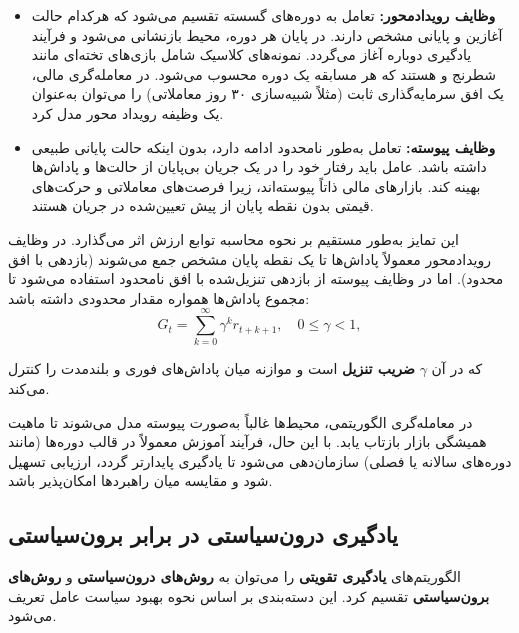 \documentclass[12pt, a4paper]{report}
\begin{document}
\begin{itemize}
    \item \textbf{وظایف رویدادمحور:} تعامل به دوره‌های گسسته تقسیم می‌شود که هرکدام حالت آغازین و پایانی مشخص دارند. در پایان هر دوره، محیط بازنشانی می‌شود و فرآیند یادگیری دوباره آغاز می‌گردد. نمونه‌های کلاسیک شامل بازی‌های تخته‌ای مانند شطرنج و  هستند که هر مسابقه یک دوره محسوب می‌شود. در معامله‌گری مالی، یک افق سرمایه‌گذاری ثابت (مثلاً شبیه‌سازی ۳۰ روز معاملاتی) را می‌توان به‌عنوان یک وظیفه رویداد محور مدل کرد.
    
    \item \textbf{وظایف پیوسته:} تعامل به‌طور نامحدود ادامه دارد، بدون اینکه حالت پایانی طبیعی داشته باشد. عامل باید رفتار خود را در یک جریان بی‌پایان از حالت‌ها و پاداش‌ها بهینه کند. بازارهای مالی ذاتاً پیوسته‌اند، زیرا فرصت‌های معاملاتی و حرکت‌های قیمتی بدون نقطه پایان از پیش تعیین‌شده در جریان هستند.
\end{itemize}

این تمایز به‌طور مستقیم بر نحوه محاسبه توابع ارزش اثر می‌گذارد. در وظایف رویدادمحور معمولاً پاداش‌ها تا یک نقطه پایان مشخص جمع می‌شوند (بازدهی با افق محدود). اما در وظایف پیوسته از بازدهی تنزیل‌شده با افق نامحدود استفاده می‌شود تا مجموع پاداش‌ها همواره مقدار محدودی داشته باشد:
\[
G_t = \sum_{k=0}^{\infty} \gamma^k r_{t+k+1}, \quad 0 \leq \gamma < 1,
\]

که در آن $\gamma$ \textbf{ضریب تنزیل}\protect{} است و موازنه میان پاداش‌های فوری و بلندمدت را کنترل می‌کند.

در معامله‌گری الگوریتمی، محیط‌ها غالباً به‌صورت پیوسته مدل می‌شوند تا ماهیت همیشگی بازار بازتاب یابد. با این حال، فرآیند آموزش معمولاً در قالب دوره‌ها (مانند دوره‌های سالانه یا فصلی) سازمان‌دهی می‌شود تا یادگیری پایدارتر گردد، ارزیابی تسهیل شود و مقایسه میان راهبردها امکان‌پذیر باشد.  

\subsection{یادگیری درون‌سیاستی\protect{} در برابر برون‌سیاستی\protect{}}

الگوریتم‌های \textbf{یادگیری تقویتی} را می‌توان به \textbf{روش‌های درون‌سیاستی} و \textbf{روش‌های برون‌سیاستی} تقسیم کرد. این دسته‌بندی بر اساس نحوه بهبود سیاست عامل تعریف می‌شود.  
\end{document}
